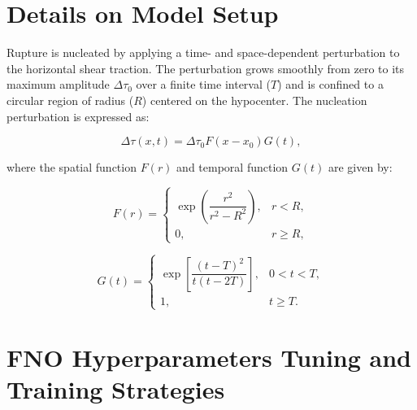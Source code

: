\documentclass[draft]{agujournal2019}
\begin{document}
\appendix
\section{Details on Model Setup}
\label{sec:appendix_a}

Rupture is nucleated by applying a time- and space-dependent perturbation to the horizontal shear traction. The perturbation grows smoothly from zero to its maximum amplitude \(\Delta \tau_0\) over a finite time interval (\(T\)) and is confined to a circular region of radius (\(R\)) centered on the hypocenter. The nucleation perturbation is expressed as:

\begin{equation}
\Delta \tau(x, t) = \Delta \tau_0 F\left(x - x_0\right) G(t), \label{eq:1}
\end{equation}

where the spatial function \(F(r)\) and temporal function \(G(t)\) are given by:

\begin{equation}
F(r) =
\begin{cases} 
\exp\left(\dfrac{r^2}{r^2 - R^2}\right), & r < R, \\
0, & r \geq R,
\end{cases}
\end{equation}

\begin{equation}
G(t) =
\begin{cases} 
\exp\left[\dfrac{(t - T)^2}{t(t - 2T)}\right], & 0 < t < T, \\
1, & t \geq T.
\end{cases}
\end{equation}

\section{FNO Hyperparameters Tuning and Training Strategies}
\label{sec:appendix_b}
\end{document}
